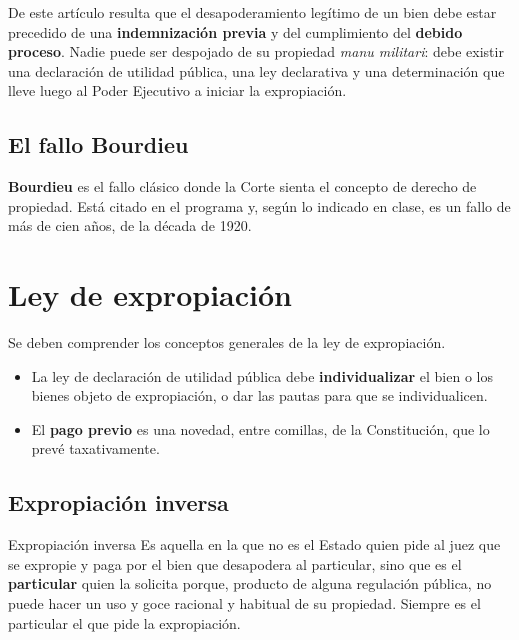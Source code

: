 \documentclass[12pt,oneside]{book}
\begin{document}
De este artículo resulta que el desapoderamiento legítimo de un bien debe estar precedido de una \textbf{indemnización previa} y del cumplimiento del \textbf{debido proceso}. Nadie puede ser despojado de su propiedad \emph{manu militari}: debe existir una declaración de utilidad pública, una ley declarativa y una determinación que lleve luego al Poder Ejecutivo a iniciar la expropiación.

\subsection{El fallo Bourdieu}

\textbf{Bourdieu} es el fallo clásico donde la Corte sienta el concepto de derecho de propiedad. Está citado en el programa y, según lo indicado en clase, es un fallo de más de cien años, de la década de 1920.

\section{Ley de expropiación}

Se deben comprender los conceptos generales de la ley de expropiación.

\begin{itemize}
    \item La ley de declaración de utilidad pública debe \textbf{individualizar} el bien o los bienes objeto de expropiación, o dar las pautas para que se individualicen.
    \item El \textbf{pago previo} es una novedad, entre comillas, de la Constitución, que lo prevé taxativamente.
\end{itemize}

\subsection{Expropiación inversa}

\begin{definition}{Expropiación inversa}
Es aquella en la que no es el Estado quien pide al juez que se expropie y paga por el bien que desapodera al particular, sino que es el \textbf{particular} quien la solicita porque, producto de alguna regulación pública, no puede hacer un uso y goce racional y habitual de su propiedad. Siempre es el particular el que pide la expropiación.
\end{definition}
\end{document}

